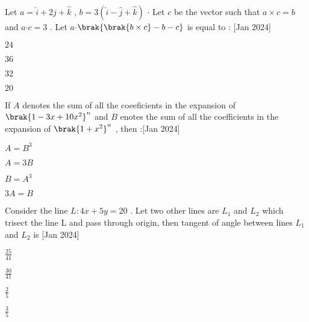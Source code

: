 \item Let $a=\hat{i}+2\hat{j}+\hat{k}$ , $b=3(\hat{i}-\hat{j}+\hat{k})$ $\cdot$ Let $c$ be the vector such that $a \times c=b$ and $a$$\cdot$$c=3$ . Let $a$$\cdot$$\brak{\brak{b \times c}-b-c}$ is equal to : \hfill{[Jan 2024]}
\begin{enumerate}   
\begin{multicols}{4}
\item $24$
\item $36$ 
\item $32$ 
\item $20$                                                                  
\end{multicols}
\end{enumerate}
\item If $A$ denotes the sum of all the coeeficients in the expansion of $\brak{1-3x+10x^2}^{n}$ and $B$ enotes the sum of all the coefficients in the expansion of $\brak{1+x^2}^{n}$ , then :\hfill{[Jan 2024]}
\begin{enumerate}
\begin{multicols}{4}
\item $ A=B^3 $
\item $ A=3B $
\item $ B=A^3 $
\item $ 3A=B $
\end{multicols}
\end{enumerate}
\item Consider the line $L:4x+5y=20$ . Let two other lines are $L_1$ and $L_2$ which trisect the line L and pass through origin, then tangent of angle between lines $L_1$ and $L_2$ is \hfill{[Jan 2024]}
\begin{enumerate}
\begin{multicols}{4}
\item $ \frac{25}{41} $
\item $ \frac{30}{41} $
\item $ \frac{2}{5} $
\item $ \frac{3}{5} $
\end{multicols}
\end{enumerate}